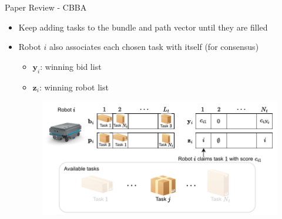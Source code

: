 \begin{frame}{Paper Review - CBBA}
    \begin{itemize}
        \item Keep adding tasks to the bundle and path vector until they are filled
        \item Robot $i$ also associates each chosen task with itself (for consensus)
        \begin{itemize}
            \item $\mathbf{y}_i$: winning bid list
            \item $\mathbf{z}_i$: winning robot list
        \end{itemize}
        \begin{figure}
            \centering
            {
            \includegraphics[width=0.95\linewidth]{Figures/bundle_construction_4.pdf}}
        \end{figure}
    \end{itemize}
\end{frame}

